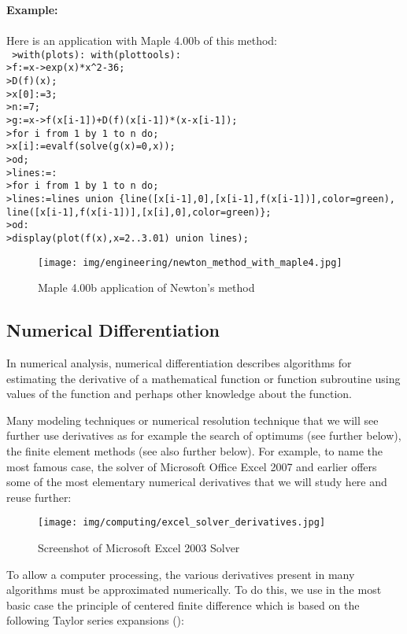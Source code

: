	\begin{tcolorbox}[colframe=black,colback=white,sharp corners]
	\textbf{{\Large {}}Example:}\\\\
	Here is an application with Maple 4.00b of this method:\\
	
	\texttt{
	>with(plots): with(plottools):\\
	>f:=x->exp(x)*x\string^2-36;\\
	>D(f)(x);\\
	>x[0]:=3;\\
	>n:=7;\\
	>g:=x->f(x[i-1])+D(f)(x[i-1])*(x-x[i-1]);\\
	>for i from 1 by 1 to n do;\\
	>x[i]:=evalf(solve(g(x)=0,x));\\
	>od;\\
	>lines:={}:\\
	>for i from 1 by 1 to n do;\\
	>lines:=lines union \{line([x[i-1],0],[x[i-1],f(x[i-1])],color=green), line([x[i-1],f(x[i-1])],[x[i],0],color=green)\};\\
	>od:\\
	>display({plot(f(x),x=2..3.01)} union lines);}
	\begin{figure}[H]
		\centering
		\texttt{[image: img/engineering/newton\_method\_with\_maple4.jpg]}
		\caption{Maple 4.00b application of Newton's method}
	\end{figure}
	\end{tcolorbox}
	
	\pagebreak
	\subsection{Numerical Differentiation}
	In numerical analysis, numerical differentiation describes algorithms for estimating the derivative of a mathematical function or function subroutine using values of the function and perhaps other knowledge about the function.
	
	Many modeling techniques or numerical resolution technique that we will see further use derivatives as for example the search of optimums (see further below), the finite element methods (see also further below). For example, to name the most famous case, the solver of Microsoft Office Excel 2007 and earlier offers some of the most elementary numerical derivatives that we will study here and reuse further:
	\begin{figure}[H]
		\centering
		\texttt{[image: img/computing/excel\_solver\_derivatives.jpg]}
		\caption{Screenshot of Microsoft Excel 2003 Solver}
	\end{figure}
	To allow a computer processing, the various derivatives  present in many algorithms must be approximated numerically. To do this, we use in the most basic case the principle of centered finite difference which is based on the following Taylor series expansions ():
	
